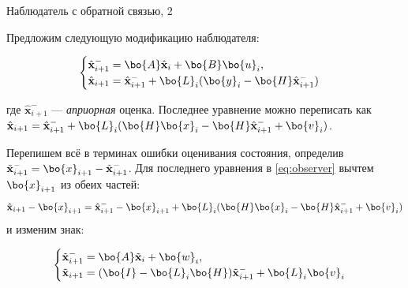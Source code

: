\documentclass{beamer}
\newcommand{\bhat}[1] {\hat{\mathbf{#1}}}
\newcommand{\btil}[1] {\Tilde{\mathbf{#1}}}
\begin{document}
\begin{frame}{Наблюдатель с обратной связью, 2}
	\begin{flushleft}
		
		
		Предложим следующую модификацию наблюдателя:
		
		\begin{equation}
			\label{eq:observer}
			\begin{cases}
				\bhat{x}_{i+1}^- = \bo{A} \bhat{x}_i + \bo{B} \bo{u}_i, \\
				\bhat{x}_{i+1} = \bhat{x}_{i+1}^- + \bo{L}_i (\bo{y}_i - \bo{H} \bhat{x}_{i+1}^-)
			\end{cases}
		\end{equation}
		
		где $\bhat{x}_{i+1}^-$ — \emph{априорная} оценка. \textcolor{mylightgray}{Последнее уравнение можно переписать как 
			$\bhat{x}_{i+1} = \bhat{x}_{i+1}^- + \bo{L}_i (\bo{H} \bo{x}_i - \bo{H} \bhat{x}_{i+1}^- + \bo{v}_i)$.} 
		
		\bigskip
		
		Перепишем всё в терминах ошибки оценивания состояния, определив $\btil{x}_{i+1}^- = \bo{x}_{i+1} - \bhat{x}_{i+1}^-$. Для последнего уравнения в \eqref{eq:observer} вычтем $\bo{x}_{i+1}$ из обеих частей:
		\begin{equation}
			\bhat{x}_{i+1}-\bo{x}_{i+1} = \bhat{x}_{i+1}^- - \bo{x}_{i+1} + 
			\bo{L}_i (\bo{H} \bo{x}_i - \bo{H} \bhat{x}_{i+1}^- + \bo{v}_i) 
		\end{equation}				
		и изменим знак:
		
		\begin{equation}
			\begin{cases}
				\btil{x}_{i+1}^- = \bo{A} \btil{x}_i + \bo{w}_i, \\
				\btil{x}_{i+1} = (\bo{I} - \bo{L}_i \bo{H}) \btil{x}_{i+1}^- + \bo{L}_i\bo{v}_i
			\end{cases}
		\end{equation}		
		
		
		
	\end{flushleft}
\end{frame}
\end{document}
